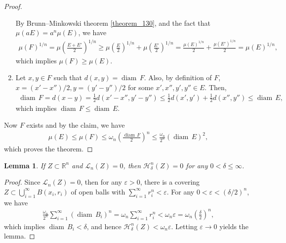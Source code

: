 \documentclass[11pt]{book}
\newtheorem{lemma}{Lemma}[chapter]
\theoremstyle{definition}
\numberwithin{equation}{chapter}
\def\H{{\mathcal H}}
\def\L{{\mathcal L}}
\def\diam{{\operatorname{diam}\,}}
\begin{document}
\begin{proof}
\begin{enumerate}[label=(\alph*)]
    By Brunn–Minkowski theorem \ref{theorem_130}, and the fact that $\mu(aE) = a^n \mu(E)$, we have
    \begin{align*}
        \mu(F)^{1/n} = \mu\left(\frac{E+E'}{2}\right)^{1/n} \geq \mu\left(\frac{E}{2}\right)^{1/n} + \mu\left(\frac{E'}{2}\right)^{1/n} = \frac{\mu(E)^{1/n}}{2} + \frac{\mu(E')^{1/n}}{2} = \mu(E)^{1/n},
    \end{align*}
    which implies $\mu(F) \geq \mu(E)$.
    
    \item Let $x,y \in F$ such that $d(x,y) = \diam F$. Also, by definition of $F$, $x = (x' - x'')/2, y = (y' - y'')/2$ for some $x',x'',y',y'' \in E$. Then,
    \begin{align*}
        \diam F = d(x - y) = \frac{1}{2} d(x'-x'',y'-y'') \leq \frac{1}{2} d(x',y') + \frac{1}{2} d(x'',y'') \leq \diam E,
    \end{align*}
    which implies $\diam F \leq \diam E$.
\end{enumerate}

Now $F$ exists and by the claim, we have
\begin{align*}
    \mu(E) \leq \mu(F) \leq \omega_n \left(\frac{\diam F}{2}\right)^n \leq \frac{\omega_n}{2^n} (\diam E)^2,
\end{align*}
which proves the theorem.
\end{proof}

\medskip

\begin{lemma}\label{lemma_12}
If $Z \subset \mathbb{R}^n$ and $\L_n(Z) = 0$, then $\H^n_{\delta}(Z) = 0$ for any $0 < \delta \leq \infty$.
\end{lemma}
\begin{proof}
Since $\L_n(Z) = 0$, then for any $\varepsilon > 0$, there is a covering $Z \subset \bigcup^\infty_{i=1} B(x_i,r_i)$ of open balls with $\sum^\infty_{i=1} r_i^n < \varepsilon$. For any $0 < \varepsilon < (\delta/2)^n$, we have
\begin{align*}
    \frac{\omega_n}{2^n} \sum^\infty_{i=1}(\diam B_i)^n = \omega_n \sum^\infty_{i=1} r_i^n < \omega_n \varepsilon = \omega_n \left(\frac{\delta}{2}\right)^n,
\end{align*}
which implies $\diam B_i < \delta$, and hence $\H^n_{\delta}(Z) < \omega_n \varepsilon$. Letting $\varepsilon \to 0$ yields the lemma.
\end{proof}
\end{document}
